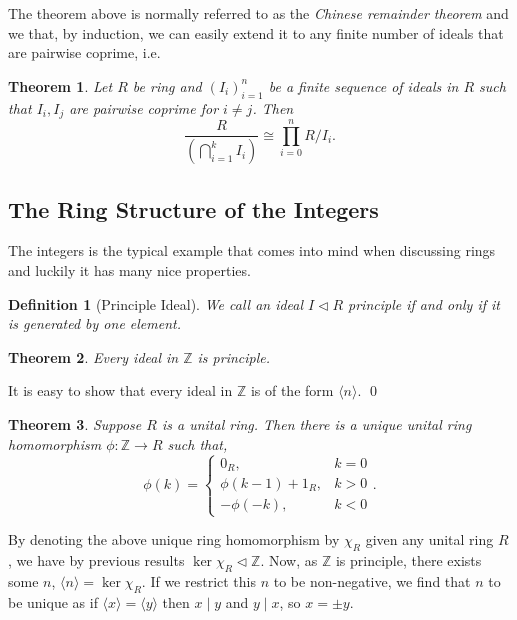 \documentclass[
]{article}
\newtheorem{theorem}{Theorem}
\newtheorem{definition}{Definition}[theorem]
\begin{document}
The theorem above is normally referred to as the \emph{Chinese remainder
theorem} and we that, by induction, we can easily extend it to any
finite number of ideals that are pairwise coprime, i.e.~

\begin{theorem}
  Let \(R\) be ring and \((I_i)_{i = 1}^n\) be a finite sequence of ideals in 
  \(R\) such that \(I_i, I_j\) are pairwise coprime for \(i \neq j\). Then 
  \[
    \frac {R} {\left(\bigcap_{i = 1}^k I_i\right)} \cong 
    \prod_{i = 0}^n R / I_i. 
  \]
\end{theorem}

\hypertarget{the-ring-structure-of-the-integers}{%
\subsection{The Ring Structure of the
Integers}\label{the-ring-structure-of-the-integers}}

The integers is the typical example that comes into mind when discussing
rings and luckily it has many nice properties.

\begin{definition}[Principle Ideal]
  We call an ideal \(I \triangleleft R\) \textit{principle} if and only if it is 
  generated by one element.
\end{definition}

\begin{theorem}
  Every ideal in \(\mathbb{Z}\) is principle.
\end{theorem}
\proof

It is easy to show that every ideal in \(\mathbb{Z}\) is of the form
\(\langle n \rangle\). \qed

\begin{theorem}
  Suppose \(R\) is a unital ring. Then there is a unique unital ring 
  homomorphism \(\phi : \mathbb{Z} \to R\) such that,
  \[
    \phi(k) = 
      \begin{cases}
        0_R,               & k = 0\\
        \phi(k - 1) + 1_R, & k > 0\\
        - \phi(-k),        & k < 0
      \end{cases}.
  \] 
\end{theorem}

By denoting the above unique ring homomorphism by \(\chi_R\) given any
unital ring \(R\), we have by previous results
\(\ker \chi_R \triangleleft \mathbb{Z}\). Now, as \(\mathbb{Z}\) is
principle, there exists some \(n\), \(\langle n \rangle = \ker \chi_R\).
If we restrict this \(n\) to be non-negative, we find that \(n\) to be
unique as if \(\langle x \rangle = \langle y \rangle\) then \(x \mid y\)
and \(y \mid x\), so \(x = \pm y\).
\end{document}
